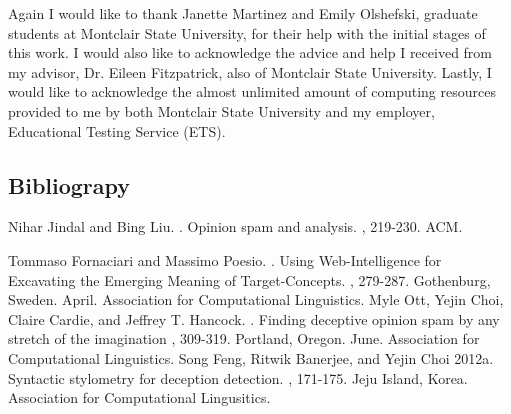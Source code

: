 \documentclass[9pt]{article}
\begin{document}
Again I would like to thank Janette Martinez and Emily Olshefski, graduate students at Montclair State University, for their help with the initial stages of this work. I would also like to acknowledge the advice and help I received from my advisor, Dr. Eileen Fitzpatrick, also of Montclair State University. Lastly, I would like to acknowledge the almost unlimited amount of computing resources provided to me by both Montclair State University and my employer, Educational Testing Service (ETS).

\begin{thebibliography}{}

\section*{Bibliograpy}
Nihar Jindal and Bing Liu.
.
\newblock Opinion spam and analysis. 
, 219-230. ACM.

Tommaso Fornaciari and Massimo Poesio.
.
\newblock Using Web-Intelligence for Excavating the
    Emerging Meaning of Target-Concepts.
, 279-287. Gothenburg, Sweden. April. Association for Computational Linguistics.
Myle Ott, Yejin Choi, Claire Cardie, and Jeffrey T. Hancock.
.
\newblock  Finding deceptive opinion spam by any stretch of the imagination
, 309-319. Portland, Oregon. June. Association for Computational Linguistics.
Song Feng, Ritwik Banerjee, and Yejin Choi
\newblock 2012a.
\newblock Syntactic stylometry for deception detection.
, 171-175. Jeju Island, Korea. Association for Computational Lingusitics.

\end{thebibliography}
\end{document}
